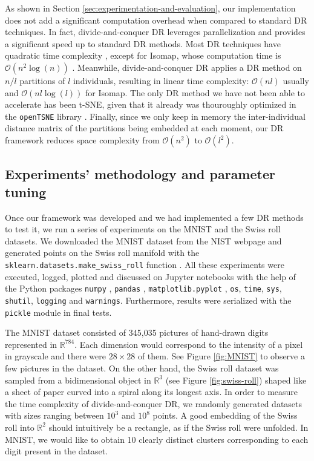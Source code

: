 As shown in Section \ref{sec:experimentation-and-evaluation}, our implementation does not add a significant computation overhead when compared to standard DR techniques. In fact, divide-and-conquer DR leverages parallelization and provides a significant speed up to standard DR methods. Most DR techniques have quadratic time complexity \citep{Kruskal1964a,Kruskal1964b,Chen2009, Vandermaaten2008}, except for Isomap, whose computation time is $\mathcal{O}(n^2\log(n))$ \citep{Tenenbaum2000}. Meanwhile, divide-and-conquer DR applies a DR method on $n/l$ partitions of $l$ individuals, resulting in linear time complexity: $\mathcal{O}(nl)$ usually and $\mathcal{O}(nl\log(l))$ for Isomap. The only DR method we have not been able to accelerate has been t-SNE, given that it already was thouroughly optimized in the \verb|openTSNE| library \citep{Policar2024}. Finally, since we only keep in memory the inter-individual distance matrix of the partitions being embedded at each moment, our DR framework reduces space complexity from $\mathcal{O}(n^2)$ to $\mathcal{O}(l^2)$.


\subsection{Experiments' methodology and parameter tuning}
\label{sec:experiment-methodology-parameter-tuning}

Once our framework was developed and we had implemented a few DR methods to test it, we run a series of experiments on the MNIST \citep{Cohen2017} and the Swiss roll \citep{Tenenbaum2000} datasets. We downloaded the MNIST dataset from the NIST webpage \citep{NIST2024} and generated points on the Swiss roll manifold with the \verb|sklearn.datasets.make_swiss_roll| function \citep{Pedregosa2011}. All these experiments were executed, logged, plotted and discussed on Jupyter notebooks \citep{Kluyver2016} with the help of the Python packages \verb|numpy| \citep{Harris2020}, \verb|pandas| \citep{Mckinney2010}, \verb|matplotlib.pyplot| \citep{Hunter2007}, \verb|os|, \verb|time|, \verb|sys|, \verb|shutil|, \verb|logging| and \verb|warnings|. Furthermore, results were serialized with the \verb|pickle| module in final tests.

The MNIST dataset consisted of 345,035 pictures of hand-drawn digits represented in $\mathbb{R}^{784}$. Each dimension would correspond to the intensity of a pixel in grayscale and there were $28 \times 28$ of them. See Figure \ref{fig:MNIST} to observe a few pictures in the dataset. On the other hand, the Swiss roll dataset was sampled from a bidimensional object in $\mathbb{R}^3$ (see Figure \ref{fig:swiss-roll}) shaped like a sheet of paper curved into a spiral along its longest axis. In order to measure the time complexity of divide-and-conquer DR, we randomly generated datasets with sizes ranging between $10^3$ and $10^8$ points. A good embedding of the Swiss roll into $\mathbb{R}^2$ should intuitively be a rectangle, as if the Swiss roll were unfolded. In MNIST, we would like to obtain 10 clearly distinct clusters corresponding to each digit present in the dataset.

